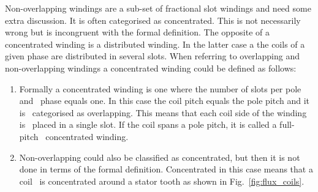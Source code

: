 Non-overlapping windings are a sub-set of fractional slot windings and need some extra discussion. It is often categorised as concentrated. This is not necessarily wrong but is incongruent with the formal definition. The opposite of a concentrated winding is a distributed winding. In the latter case a the coils of a given phase are distributed in several slots. When referring to overlapping and non-overlapping windings a concentrated winding could be defined as follows:
\begin{enumerate}
  \item Formally a concentrated winding is one where the number of slots per pole and~%
  phase equals one. In this case the coil pitch equals the pole pitch and it is~%
  categorised as overlapping. This means that each coil side of the winding is~%
  placed in a single slot. If the coil spans a pole pitch, it is called a full-pitch~%
  concentrated winding.
  \item Non-overlapping could also be classified as concentrated, but then it is not~%
  done in terms of the formal definition. Concentrated in this case means that a coil~%
  is concentrated around a stator tooth as shown in Fig.~\ref{fig:flux_coils}.
\end{enumerate}

